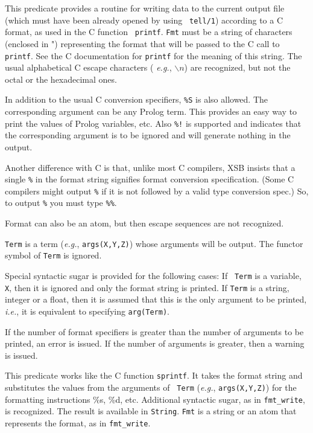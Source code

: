 \begin{description}
\vspace{-7mm}
    This predicate provides a routine for writing data to the current
    output file (which must have been already opened by using {\tt
    tell/1}) according to a C format, as used in the C function {\tt
    printf}.  {\tt Fmt} must be a string of characters (enclosed in ")
    representing the format that will be passed to the C call to {\tt
    printf}.  See the C documentation for {\tt printf} for the meaning
    of this string.  The usual alphabetical C escape characters ({\it
    e.g.}, $\backslash n$) are recognized, but not the octal or the
    hexadecimal ones.

    In addition to the usual C conversion specifiers, {\tt \%S} is also
    allowed. The corresponding argument can be any Prolog term. This
    provides an easy way to print the values of Prolog variables, etc.  
    Also {\tt \%!} is supported and indicates that the corresponding argument
    is to be ignored and will generate nothing in the output.

    Another difference with C is that, unlike most C compilers, XSB insists
    that a single {\tt \%} in the format string signifies format conversion
    specification. (Some C compilers might output {\tt \%} if it is not
    followed by a valid type conversion spec.) So, to output {\tt \%}
    you must type {\tt \%\%}.
    
    Format can also be an atom, but then escape sequences are not
    recognized.

    {\tt Term} is a term ({\it e.g.}, {\tt args(X,Y,Z)}) whose arguments
    will be output. The functor symbol of {\tt Term} is ignored.
    
    Special syntactic sugar is provided for the following cases: If {\tt
      Term} is a variable, {\tt X}, then it is ignored and only the format
    string is printed. If {\tt Term} is a string, integer or a float, then
    it is assumed that this is the only argument to be printed, {\it i.e.},
    it is equivalent to specifying {\tt arg(Term)}.

    If the number of format specifiers is greater than the number of
    arguments to be printed, an error is issued. If the number of arguments
    is greater, then a warning is issued.

    This predicate works like the C function {\tt sprintf}. It takes the
    format string and substitutes the values from the arguments of {\tt
      Term} ({\it e.g.}, {\tt args(X,Y,Z)}) for the formatting instructions
    \%s, \%d, etc. Additional syntactic sugar, as in \verb|fmt_write|, is
    recognized. The result is available in {\tt String}. {\tt Fmt} is a
    string or an atom that represents the format, as in
    {\tt fmt\_write}.
    

\end{description}
